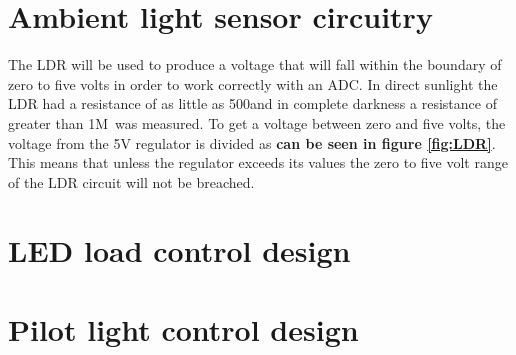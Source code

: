 \section{Ambient light sensor circuitry}
The LDR will be used to produce a voltage that will fall within the boundary of zero to five volts in order to work correctly with an ADC. In direct sunlight the LDR had a resistance of as little as 500\textohm and in complete darkness a resistance of greater than 1M\textohm \ was measured.  To get a voltage between zero and five volts, the voltage from the 5V regulator is divided as \textbf{can be seen in figure \ref{fig:LDR}}. This means that unless the regulator exceeds its values the zero to five volt range of the LDR circuit will not be breached.

\section{LED load control design }

\section{Pilot light control design}





